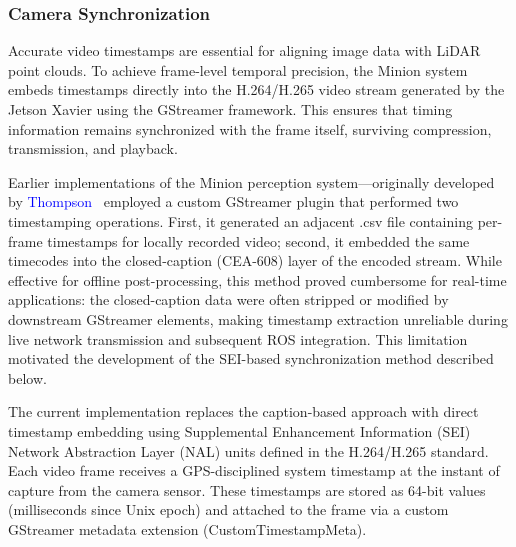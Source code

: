 \documentclass{erauthesis}
\begin{document}
\subsubsection{Camera Synchronization} \label{time_sync_cam}

Accurate video timestamps are essential for aligning image data with LiDAR point clouds. To achieve frame-level temporal precision, the Minion system embeds timestamps directly into the H.264/H.265 video stream generated by the Jetson Xavier using the GStreamer framework. This ensures that timing information remains synchronized with the frame itself, surviving compression, transmission, and playback.

Earlier implementations of the Minion perception system—originally developed by \textcolor{blue}{Thompson~\cite{thompson2023}} employed a custom GStreamer plugin that performed two timestamping operations.
First, it generated an adjacent .csv file containing per-frame timestamps for locally recorded video; second, it embedded the same timecodes into the closed-caption (CEA-608) layer of the encoded stream.
While effective for offline post-processing, this method proved cumbersome for real-time applications: the closed-caption data were often stripped or modified by downstream GStreamer elements, making timestamp extraction unreliable during live network transmission and subsequent ROS integration.
This limitation motivated the development of the SEI-based synchronization method described below.


The current implementation replaces the caption-based approach with direct timestamp embedding using Supplemental Enhancement Information (SEI) Network Abstraction Layer (NAL) units defined in the H.264/H.265 standard.
Each video frame receives a GPS-disciplined system timestamp at the instant of capture from the camera sensor. These timestamps are stored as 64-bit values (milliseconds since Unix epoch) and attached to the frame via a custom GStreamer metadata extension (CustomTimestampMeta).

\end{document}

